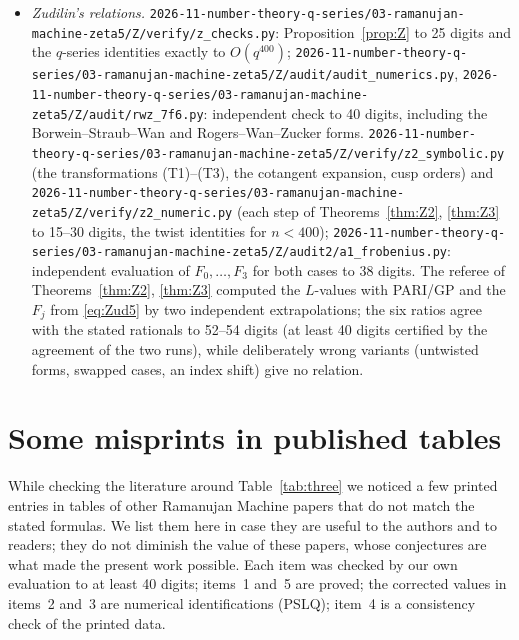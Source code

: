 \documentclass[11pt]{amsart}
\theoremstyle{definition}
\theoremstyle{remark}
\numberwithin{equation}{section}
\newcommand{\file}[1]{\nolinkurl{2026-11-number-theory-q-series/03-ramanujan-machine-zeta5/#1}}
\begin{document}
\begin{itemize}[leftmargin=1.3em]
\item \emph{Zudilin's relations.} \file{Z/verify/z_checks.py}: Proposition~\ref{prop:Z} to 25 digits and the $q$-series identities exactly to $O(q^{400})$; \file{Z/audit/audit_numerics.py}, \file{Z/audit/rwz_7f6.py}: independent check to 40 digits, including the Borwein--Straub--Wan and Rogers--Wan--Zucker forms. \file{Z/verify/z2_symbolic.py} (the transformations (T1)--(T3), the cotangent expansion, cusp orders) and \file{Z/verify/z2_numeric.py} (each step of Theorems~\ref{thm:Z2}, \ref{thm:Z3} to 15--30 digits, the twist identities for $n<400$); \file{Z/audit2/a1_frobenius.py}: independent evaluation of $F_0,\dots,F_3$ for both cases to 38 digits. The referee of Theorems~\ref{thm:Z2}, \ref{thm:Z3} computed the $L$-values with PARI/GP and the $F_j$ from \eqref{eq:Zud5} by two independent extrapolations; the six ratios agree with the stated rationals to 52--54 digits (at least 40 digits certified by the agreement of the two runs), while deliberately wrong variants (untwisted forms, swapped cases, an index shift) give no relation.
\end{itemize}

\appendix
\section{Some misprints in published tables}\label{app:errata}

While checking the literature around Table~\ref{tab:three} we noticed a few printed entries in tables of other Ramanujan Machine papers that do not match the stated formulas. We list them here in case they are useful to the authors and to readers; they do not diminish the value of these papers, whose conjectures are what made the present work possible. Each item was checked by our own evaluation to at least 40 digits; items~1 and~5 are proved; the corrected values in items~2 and~3 are numerical identifications (PSLQ); item~4 is a consistency check of the printed data.
\end{document}
